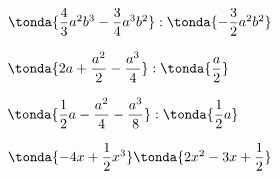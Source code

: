 \begin{esercizio}
\begin{htmulticols}{2}
\begin{enumeratea}
\item \(\tonda{\dfrac{4}{3}a^{2}b^{3}-\dfrac{3}{4}a^{3}b^{2}}:
      \tonda{-{\dfrac{3}{2} a^{2}b^{2}}}\)
\item \(\tonda{2a+\dfrac{a^{2}}{2}-\dfrac{a^{3}}{4}}:
      \tonda{\dfrac{a}{2}}\)
\item \(\tonda{\dfrac{1}{2}a-\dfrac{a^{2}}{4}-\dfrac{a^{3}}{8}}:
        \tonda{\dfrac{1}{2} a}\)
\item 
\(\tonda{-4x+\dfrac{1}{2}x^{3}}\tonda{2x^{2}-3x+\dfrac{1}{2}}\)
\end{enumeratea}
\end{htmulticols}
\end{esercizio}

\pagebreak %

\subsubsection*{}

